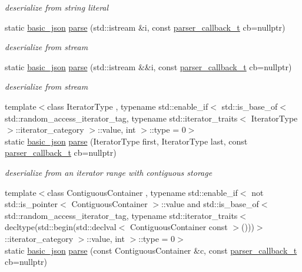\begin{DoxyCompactItemize}
\begin{DoxyCompactList}\small\item\em deserialize from string literal \end{DoxyCompactList}\item 
static \mbox{\hyperlink{classnlohmann_1_1basic__json}{basic\+\_\+json}} \mbox{\hyperlink{classnlohmann_1_1basic__json_a4cd30efe5c33a7cf73a0c6495bb16054}{parse}} (std\+::istream \&i, const \mbox{\hyperlink{classnlohmann_1_1basic__json_aecae491e175f8767c550ae3c59e180e3}{parser\+\_\+callback\+\_\+t}} cb=nullptr)
\begin{DoxyCompactList}\small\item\em deserialize from stream \end{DoxyCompactList}\item 
static \mbox{\hyperlink{classnlohmann_1_1basic__json}{basic\+\_\+json}} \mbox{\hyperlink{classnlohmann_1_1basic__json_a3bd712a1351ba28e5440fac2359da1cb}{parse}} (std\+::istream \&\&i, const \mbox{\hyperlink{classnlohmann_1_1basic__json_aecae491e175f8767c550ae3c59e180e3}{parser\+\_\+callback\+\_\+t}} cb=nullptr)
\begin{DoxyCompactList}\small\item\em deserialize from stream \end{DoxyCompactList}\item 
{\footnotesize template$<$class Iterator\+Type , typename std\+::enable\+\_\+if$<$ std\+::is\+\_\+base\+\_\+of$<$ std\+::random\+\_\+access\+\_\+iterator\+\_\+tag, typename std\+::iterator\+\_\+traits$<$ Iterator\+Type $>$\+::iterator\+\_\+category $>$\+::value, int $>$\+::type  = 0$>$ }\\static \mbox{\hyperlink{classnlohmann_1_1basic__json}{basic\+\_\+json}} \mbox{\hyperlink{classnlohmann_1_1basic__json_a360d37260add46be89881db2366fe343}{parse}} (Iterator\+Type first, Iterator\+Type last, const \mbox{\hyperlink{classnlohmann_1_1basic__json_aecae491e175f8767c550ae3c59e180e3}{parser\+\_\+callback\+\_\+t}} cb=nullptr)
\begin{DoxyCompactList}\small\item\em deserialize from an iterator range with contiguous storage \end{DoxyCompactList}\item 
{\footnotesize template$<$class Contiguous\+Container , typename std\+::enable\+\_\+if$<$ not std\+::is\+\_\+pointer$<$ Contiguous\+Container $>$\+::value and std\+::is\+\_\+base\+\_\+of$<$ std\+::random\+\_\+access\+\_\+iterator\+\_\+tag, typename std\+::iterator\+\_\+traits$<$ decltype(std\+::begin(std\+::declval$<$ Contiguous\+Container const $>$()))$>$\+::iterator\+\_\+category $>$\+::value, int $>$\+::type  = 0$>$ }\\static \mbox{\hyperlink{classnlohmann_1_1basic__json}{basic\+\_\+json}} \mbox{\hyperlink{classnlohmann_1_1basic__json_a00795fca3388571ba4a56a1ea6e0466b}{parse}} (const Contiguous\+Container \&c, const \mbox{\hyperlink{classnlohmann_1_1basic__json_aecae491e175f8767c550ae3c59e180e3}{parser\+\_\+callback\+\_\+t}} cb=nullptr)

\end{DoxyCompactItemize}
